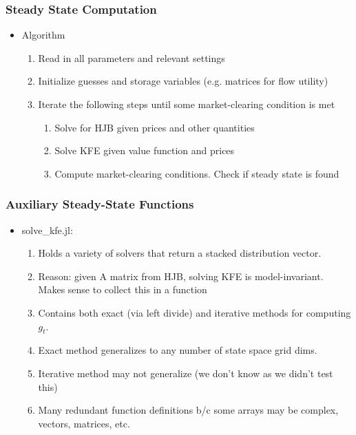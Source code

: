 \documentclass{beamer}
\begin{document}
\begin{frame}
\frametitle{Steady State Computation}
\begin{itemize}
\item Algorithm
  \begin{enumerate}
  \item Read in all parameters and relevant settings
  \item Initialize guesses and storage variables (e.g. matrices for flow utility)
  \item Iterate the following steps until some market-clearing condition is met
    \begin{enumerate}
    \item Solve for HJB given prices and other quantities
    \item Solve KFE given value function and prices
    \item Compute market-clearing conditions. Check if steady state is found
    \end{enumerate}
  \end{enumerate}
\end{itemize}
\end{frame}
\begin{frame}
\frametitle{Auxiliary Steady-State Functions}
\begin{itemize}
\item solve\_kfe.jl:
  \begin{enumerate}
  \item Holds a variety of solvers that return a stacked distribution vector.
  \item Reason: given A matrix from HJB, solving KFE is model-invariant. Makes sense to collect this in a function
  \item Contains both exact (via left divide) and iterative methods for computing $g_t$.
  \item Exact method generalizes to any number of state space grid dims.
  \item Iterative method may not generalize (we don't know as we didn't test this)
  \item Many redundant function definitions b/c some arrays may be complex, vectors, matrices, etc.
  \end{enumerate}
\end{itemize}
\end{frame}
\end{document}

